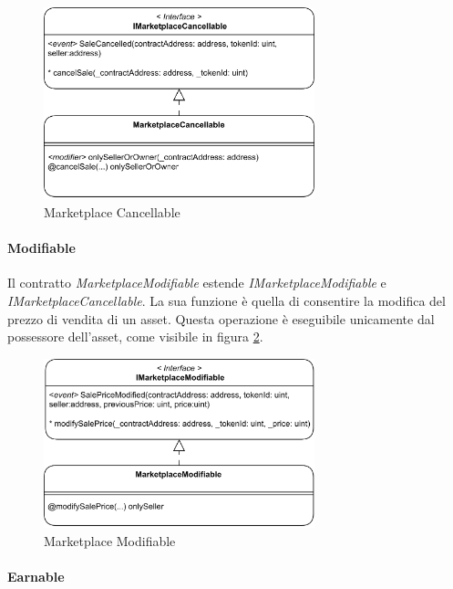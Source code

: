 \begin{figure}[H]
    \centering
    \includegraphics[width=0.7\textwidth]{images/blockchainContracts/MarketplaceCancellable.png}
    \caption{Marketplace Cancellable}
    \label{fig:marketplaceCancellable}
\end{figure}

\paragraph{Modifiable}
Il contratto \textit{MarketplaceModifiable} estende \textit{IMarketplaceModifiable} e \textit{IMarketplaceCancellable}. La sua funzione è quella di consentire la modifica del prezzo di vendita di un asset. Questa operazione è eseguibile unicamente dal possessore dell'asset, come visibile in figura \ref{fig:marketplaceModifiable}.

\begin{figure}[H]
    \centering
    \includegraphics[width=0.7\textwidth]{images/blockchainContracts/MarketplaceModifiable.png}
    \caption{Marketplace Modifiable}
    \label{fig:marketplaceModifiable}
\end{figure}

\paragraph{Earnable}
\label{sec:marketplace-earnable}

